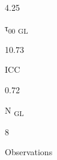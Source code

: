 \documentclass[
  letterpaper,
  DIV=11,
  numbers=noendperiod]{scrartcl}
\begin{document}
\begin{table}
\begin{minipage}[t]{\linewidth}
{4.25

}

\end{minipage}%
\newline
\begin{minipage}[t]{\linewidth}

{\centering 

τ\textsubscript{00} \textsubscript{GL}

}

\end{minipage}%
\newline
\begin{minipage}[t]{\linewidth}

{\centering 

10.73

}

\end{minipage}%
\newline
\begin{minipage}[t]{\linewidth}

{\centering 

ICC

}

\end{minipage}%
\newline
\begin{minipage}[t]{\linewidth}

{\centering 

0.72

}

\end{minipage}%
\newline
\begin{minipage}[t]{\linewidth}

{\centering 

N \textsubscript{GL}

}

\end{minipage}%
\newline
\begin{minipage}[t]{\linewidth}

{\centering 

8

}

\end{minipage}%
\newline
\begin{minipage}[t]{\linewidth}

{\centering 

Observations

}
\end{minipage}
\end{table}
\end{document}
